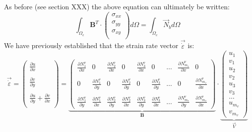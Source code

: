 As before (see section XXX) the above equation can ultimately be written:
\begin{equation}
\int_{\Omega_e} {\bm B}^T \cdot 
\left(
\begin{array}{c}
\sigma_{xx}\\
\sigma_{yy}\\
\sigma_{xy}\\
\end{array}
\right)
d\Omega
=
\int_{\Omega_e} {\vec N}_b d\Omega 
\end{equation}
We have previously established that the strain rate 
vector $\vec{\dot \varepsilon}$ is:
\begin{equation}
\vec{\dot\varepsilon}=
\left(
\begin{array}{c}
\frac{\partial u}{\partial x} \\ \\
\frac{\partial v}{\partial y} \\ \\
\frac{\partial u}{\partial y} + \frac{\partial v}{\partial x} \\
\end{array}
\right)
=
\underbrace{
\left(
\begin{array}{ccccccccccc}
\frac{\partial N_1^\upnu}{\partial x} & 0 & 
\frac{\partial N_2^\upnu}{\partial x} & 0 & 
\frac{\partial N_3^\upnu}{\partial x} & 0 & \dots & 
\frac{\partial N_{m_v}^\upnu}{\partial x} & 0
\\  \\
0 & \frac{\partial N_1^\upnu}{\partial y} & 
0 & \frac{\partial N_2^\upnu}{\partial y} &
0 & \frac{\partial N_3^\upnu}{\partial y} & \dots & 
0 & \frac{\partial N_{m_v}^\upnu}{\partial x} 
\\ \\
\frac{\partial N_1^\upnu}{\partial y} &  \frac{\partial N_1^\upnu}{\partial x} &  
\frac{\partial N_2^\upnu}{\partial y} &  \frac{\partial N_2^\upnu}{\partial x} & 
\frac{\partial N_3^\upnu}{\partial y} &  \frac{\partial N_3^\upnu}{\partial x} &   \dots &  
\frac{\partial N_{m_v}^\upnu}{\partial y} &  \frac{\partial N_{m_v}^\upnu}{\partial x}  
\end{array}
\right) 
}_{\bm B}
\cdot
\underbrace{
\left(
\begin{array}{c}
u_1 \\ v_1 \\ u_2 \\ v_2 \\ u_3 \\ v_3 \\ \dots \\ u_{m_v} \\ v_{m_v}
\end{array}
\right)
}_{\vec V}
\end{equation}
